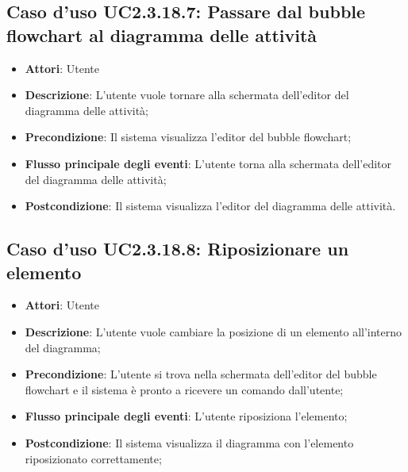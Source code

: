 \documentclass[../AnalisiDeiRequisiti.tex]{subfiles}
\begin{document}
					\subsection{Caso d'uso UC2.3.18.7: Passare dal bubble flowchart al diagramma delle attività}
					\begin{itemize}
						\item \textbf{Attori}: Utente
						\item \textbf{Descrizione}: L'utente vuole tornare alla schermata dell'editor del diagramma delle attività;
						\item \textbf{Precondizione}: Il sistema visualizza l'editor del bubble flowchart;
						\item \textbf{Flusso principale degli eventi}: L'utente torna alla schermata dell'editor del diagramma delle attività;
						\item \textbf{Postcondizione}: Il sistema visualizza l'editor del diagramma delle attività.
					\end{itemize}
					\subsection{Caso d'uso UC2.3.18.8: Riposizionare un elemento}
					\begin{itemize}
						\item \textbf{Attori}: Utente
						\item \textbf{Descrizione}: L'utente vuole cambiare la posizione di un elemento all'interno del diagramma;
						\item \textbf{Precondizione}: L'utente si trova nella schermata dell'editor del bubble flowchart e il sistema è pronto a ricevere un comando dall'utente;
						\item \textbf{Flusso principale degli eventi}: L'utente riposiziona l'elemento;
						\item \textbf{Postcondizione}: Il sistema visualizza il diagramma con l'elemento riposizionato correttamente;
					\end{itemize}
\end{document}
